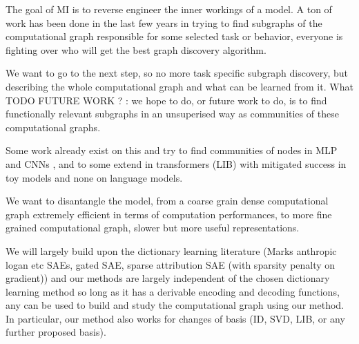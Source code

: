 \documentclass{article}
\begin{document}
The goal of MI is to reverse engineer the inner workings of a model.
A ton of work has been done in the last few years in trying to find subgraphs of the computational graph responsible for some selected task or behavior, everyone is fighting over who will get the best graph discovery algorithm.

We want to go to the next step, so no more task specific subgraph discovery, but describing the whole computational graph and what can be learned from it. What TODO FUTURE WORK ? : we hope to do, or future work to do, is to find functionally relevant subgraphs in an unsuperised way as communities of these computational graphs. %


Some work already exist on this and try to find communities of nodes in MLP and CNNs \citep{lu2019checking, filan2021clusterability}, and to some extend in transformers (LIB) with mitigated success in toy models and none on language models. %

We want to disantangle the model, from a coarse grain dense computational graph extremely efficient in terms of computation performances, to more fine grained computational graph, slower but more useful representations. %

We will largely build upon the dictionary learning literature (Marks anthropic logan etc SAEs, gated SAE, sparse attribution SAE (with sparsity penalty on gradient)) and our methods are largely independent of the chosen dictionary learning method so long as it has a derivable encoding and decoding functions, any can be used to build and study the computational graph using our method. In particular, our method also works for changes of basis (ID, SVD, LIB, or any further proposed basis).%
\end{document}
